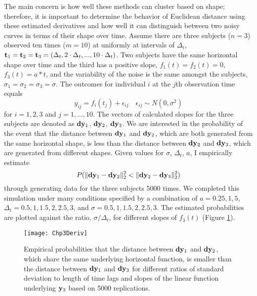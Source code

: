 The main concern is how well these methods can cluster based on shape; therefore, it is important to determine the behavior of Euclidean distance using these estimated derivatives and how well it can distinguish between two noisy curves in terms of their shape over time. Assume there are three subjects ($n=3$) observed ten times ($m=10$) at uniformly at intervals of $\Delta_{t}$, $\mathbf t_1 = \mathbf t_2=\mathbf t_3 = (\Delta_t,2\cdot\Delta_t,...,10\cdot\Delta_t)$. Two subjects have the same horizontal shape over time and the third has a positive slope, $f_1(t) = f_2(t) =0$, $f_3(t)=a*t$, and the variability of the noise is the same amongst the subjects, $\sigma_1=\sigma_2=\sigma_3=\sigma$. The outcomes for individual $i$ at the $j$th observation time equals
$$y_{ij}=f_{i}(t_{j})+\epsilon_{ij}\quad \epsilon_{ij}\sim N(0,\sigma^{2})$$
for $i=1,2,3$ and $j=1,...,10$. The vectors of calculated slopes for the three subjects are denoted as $\mathbf d\mathbf y_1$, $\mathbf d\mathbf y_2$, $\mathbf d\mathbf y_3$. We are interested in the probability of the event that the distance between $\mathbf d\mathbf y_1$ and $\mathbf d\mathbf y_2$, which are both generated from the same horizontal shape, is less than the distance between $\mathbf d\mathbf y_2$ and $\mathbf d\mathbf y_3$, which are generated from different shapes. Given values for $\sigma$, $\Delta_t$, $a$, I empirically estimate
$$P(\|\mathbf d\mathbf y_1-\mathbf d\mathbf y_2\|^2_2 < \|\mathbf d\mathbf y_2-\mathbf d\mathbf y_3\|^{2}_{2})$$
through generating data for the three subjects 5000 times. We completed this simulation under many conditions specified by a combination of $a = 0.25, 1, 5$, $\Delta_t = 0.5,1,1.5,2,2.5,3$, and $\sigma = 0.5,1,1.5,2,2.5,3$. The estimated probabilities are plotted against the ratio, $\sigma/\Delta_t$, for different slopes of $f_{3}(t)$ (Figure \ref{fig:3-3}). 

\begin{figure}
\begin{center}
\texttt{[image: Chp3Deriv]}
\end{center}
\caption{Empirical probabilities that the distance between $\mathbf d\mathbf y_{1}$ and $\mathbf d\mathbf y_{2}$, which share the same underlying horizontal function, is smaller than the distance between $\mathbf d\mathbf y_{1}$ and $\mathbf d\mathbf y_{3}$ for different ratios of standard deviation to length of time lags and slopes of the linear function underlying $\mathbf y_{3}$ based on 5000 replications.}
\label{fig:3-3} 
\end{figure}

